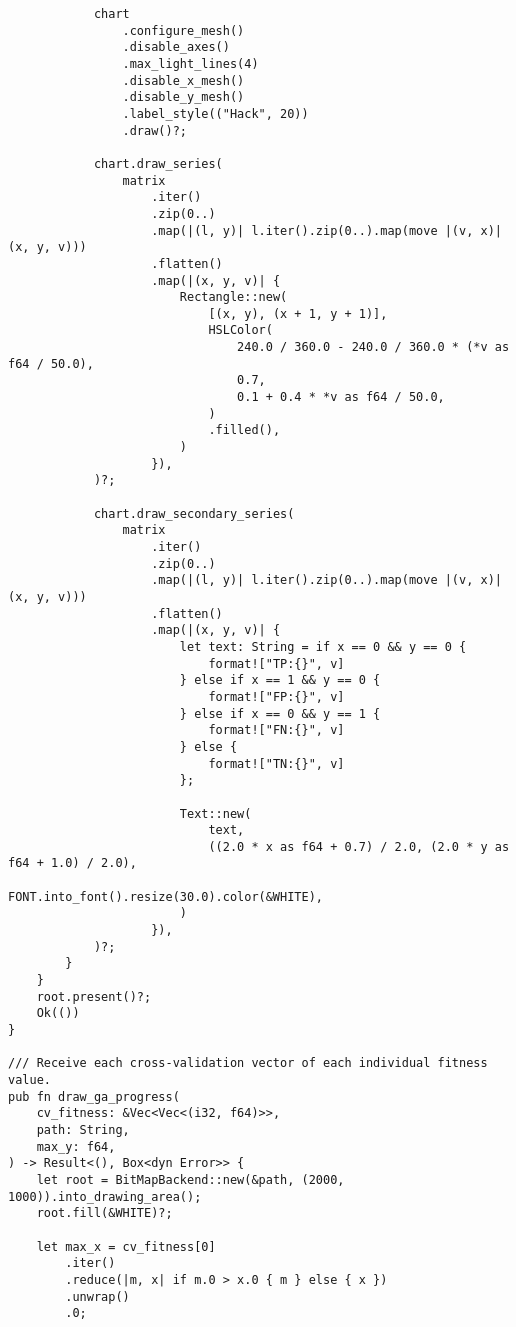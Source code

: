 \begin{code}
\begin{verbatim}
            chart
                .configure_mesh()
                .disable_axes()
                .max_light_lines(4)
                .disable_x_mesh()
                .disable_y_mesh()
                .label_style(("Hack", 20))
                .draw()?;

            chart.draw_series(
                matrix
                    .iter()
                    .zip(0..)
                    .map(|(l, y)| l.iter().zip(0..).map(move |(v, x)| (x, y, v)))
                    .flatten()
                    .map(|(x, y, v)| {
                        Rectangle::new(
                            [(x, y), (x + 1, y + 1)],
                            HSLColor(
                                240.0 / 360.0 - 240.0 / 360.0 * (*v as f64 / 50.0),
                                0.7,
                                0.1 + 0.4 * *v as f64 / 50.0,
                            )
                            .filled(),
                        )
                    }),
            )?;

            chart.draw_secondary_series(
                matrix
                    .iter()
                    .zip(0..)
                    .map(|(l, y)| l.iter().zip(0..).map(move |(v, x)| (x, y, v)))
                    .flatten()
                    .map(|(x, y, v)| {
                        let text: String = if x == 0 && y == 0 {
                            format!["TP:{}", v]
                        } else if x == 1 && y == 0 {
                            format!["FP:{}", v]
                        } else if x == 0 && y == 1 {
                            format!["FN:{}", v]
                        } else {
                            format!["TN:{}", v]
                        };

                        Text::new(
                            text,
                            ((2.0 * x as f64 + 0.7) / 2.0, (2.0 * y as f64 + 1.0) / 2.0),
                            FONT.into_font().resize(30.0).color(&WHITE),
                        )
                    }),
            )?;
        }
    }
    root.present()?;
    Ok(())
}

/// Receive each cross-validation vector of each individual fitness value.
pub fn draw_ga_progress(
    cv_fitness: &Vec<Vec<(i32, f64)>>,
    path: String,
    max_y: f64,
) -> Result<(), Box<dyn Error>> {
    let root = BitMapBackend::new(&path, (2000, 1000)).into_drawing_area();
    root.fill(&WHITE)?;

    let max_x = cv_fitness[0]
        .iter()
        .reduce(|m, x| if m.0 > x.0 { m } else { x })
        .unwrap()
        .0;


\end{verbatim}
\end{code}
